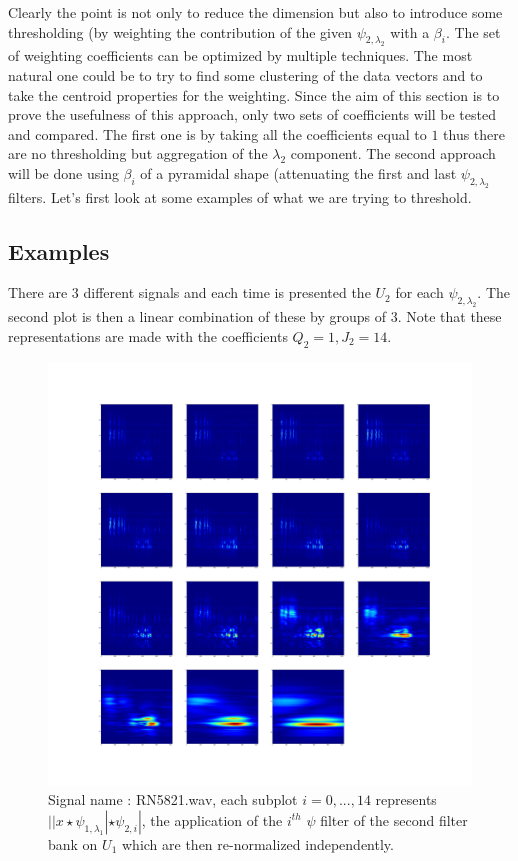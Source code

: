 \documentclass[a4paper]{report}
\begin{document}
Clearly the point is not only to reduce the dimension but also to introduce some thresholding (by weighting the contribution of the given $\psi_{2,\lambda_2}$ with a $\beta_i$. The set of weighting coefficients can be optimized by multiple techniques. The most natural one could be to try to find some clustering of the data vectors and to take the centroid properties for the weighting. Since the aim of this section is to prove the usefulness of this approach, only two sets of coefficients will be tested and compared. The first one is by taking all the coefficients equal to $1$ thus there are no thresholding but aggregation of the $\lambda_2$ component. The second approach will be done using $\beta_i$ of a pyramidal shape (attenuating the first and last $\psi_{2,\lambda_2}$ filters. Let's first look at some examples of what we are trying to threshold.


\subsection{Examples}

There are $3$ different signals and each time is presented the $U_2$ for each $\psi_{2,\lambda_2}$. The second plot is then a linear combination of these by groups of $3$. Note that these representations are made with the coefficients $Q_2=1,J_2=14$.


\begin{figure}[H]
\begin{center}
\includegraphics[scale=0.1]{RN5821_1.png}\caption{Signal name : RN5821.wav, each subplot $i=0,...,14$ represents $||x \star \psi_{1,\lambda_1}|\star \psi_{2,i}|$, the application of the $i^{th}$ $\psi$ filter of the second filter bank on $U_1$ which are then re-normalized independently.}
\end{center}
\end{figure}
\end{document}
